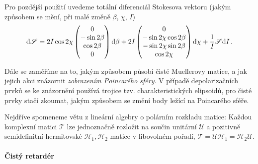 Pro pozdější použití uvedeme totální diferenciál Stokesova vektoru (jakým způsobem se mění, při malé změně $\beta$, $\chi$, $I$)
\begin{equation}
\label{eqn:Stokes-diferencial}
    \textrm{d}\mathscr{S} = 
    2I\cos2\chi \begin{pmatrix} 0\\-\sin2\beta\\\cos2\beta\\0 \end{pmatrix} \textrm{d}\beta 
    + 2I\begin{pmatrix} 0\\-\sin2\chi\cos2\beta\\-\sin2\chi\sin2\beta\\\cos2\chi \end{pmatrix}\textrm{d}\chi
    + \frac{1}{I}\mathscr{S}\textrm{d}I \,.
\end{equation}


Dále se zaměříme na to, jakým způsobem působí čisté Muellerovy matice, a jak jejich akci znázornit \emph{zobrazením Poincarého sféry}\cite{gilReviewMuellerMatrix2014,ossikovskiPoincareSphereMapping2013}.
V případě depolarizačních prvků se ke znázornění používá trojice tzv. charakteristických elipsoidů, pro čisté prvky stačí zkoumat, jakým způsobem se změní body ležící na Poincarého sféře.

Nejdříve spomeneme větu z lineární algebry o polárním rozkladu matice\cite{motlPestujemeLinearniAlgebru2002}: Každou komplexní matici $\mathcal{T}$ lze jednoznačně rozložit na součin unitární $\mathcal{U}$ a pozitivně semidefinitní hermitovské $\mathcal{H}_1, \mathcal{H}_2$ matice v libovolném pořadí, $\mathcal{T}=\mathcal{U}\mathcal{H}_1 = \mathcal{H}_2 \mathcal{U}$.

\paragraph{Čistý retardér}

